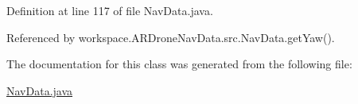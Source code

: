 Definition at line 117 of file Nav\+Data.\+java.



Referenced by workspace.\+A\+R\+Drone\+Nav\+Data.\+src.\+Nav\+Data.\+get\+Yaw().



The documentation for this class was generated from the following file\+:\begin{DoxyCompactItemize}
\item 
\hyperlink{_nav_data_8java}{Nav\+Data.\+java}\end{DoxyCompactItemize}
